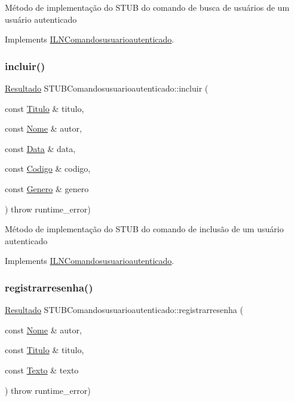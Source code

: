 Método de implementação do S\+T\+UB do comando de busca de usuários de um usuário autenticado 

Implements \hyperlink{classILNComandosusuarioautenticado}{I\+L\+N\+Comandosusuarioautenticado}.

\mbox{\label{classSTUBComandosusuarioautenticado_ac9e1818a8953c75e8c608f2eac526d4d}} 
\subsubsection{\texorpdfstring{incluir()}{incluir()}}
{\footnotesize\ttfamily \hyperlink{classResultado}{Resultado} S\+T\+U\+B\+Comandosusuarioautenticado\+::incluir (\begin{DoxyParamCaption}\item[{const \hyperlink{classTitulo}{Titulo} \&}]{titulo,  }\item[{const \hyperlink{classNome}{Nome} \&}]{autor,  }\item[{const \hyperlink{classData}{Data} \&}]{data,  }\item[{const \hyperlink{classCodigo}{Codigo} \&}]{codigo,  }\item[{const \hyperlink{classGenero}{Genero} \&}]{genero }\end{DoxyParamCaption}) throw  runtime\+\_\+error) \hspace{0.3cm}{\ttfamily [virtual]}}

Método de implementação do S\+T\+UB do comando de inclusão de um usuário autenticado 

Implements \hyperlink{classILNComandosusuarioautenticado}{I\+L\+N\+Comandosusuarioautenticado}.

\mbox{\label{classSTUBComandosusuarioautenticado_a39e1508359209fe795a91817f0c96e20}} 
\subsubsection{\texorpdfstring{registrarresenha()}{registrarresenha()}}
{\footnotesize\ttfamily \hyperlink{classResultado}{Resultado} S\+T\+U\+B\+Comandosusuarioautenticado\+::registrarresenha (\begin{DoxyParamCaption}\item[{const \hyperlink{classNome}{Nome} \&}]{autor,  }\item[{const \hyperlink{classTitulo}{Titulo} \&}]{titulo,  }\item[{const \hyperlink{classTexto}{Texto} \&}]{texto }\end{DoxyParamCaption}) throw  runtime\+\_\+error) \hspace{0.3cm}{\ttfamily [virtual]}}

